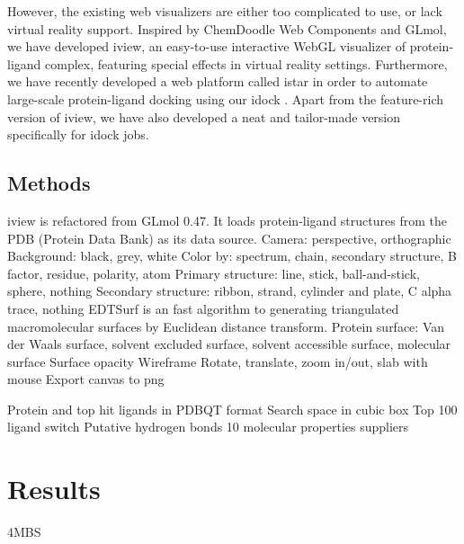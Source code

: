 \documentclass{bioinfo}
\begin{document}
However, the existing web visualizers are either too complicated to use, or lack virtual reality support. Inspired by ChemDoodle Web Components and GLmol, we have developed iview, an easy-to-use interactive WebGL visualizer of protein-ligand complex, featuring special effects in virtual reality settings. Furthermore, we have recently developed a web platform called istar in order to automate large-scale protein-ligand docking using our idock \citep{1153}. Apart from the feature-rich version of iview, we have also developed a neat and tailor-made version specifically for idock jobs.


\begin{methods}
\section{Methods}

iview is refactored from GLmol 0.47. It loads protein-ligand structures from the PDB (Protein Data Bank) \cite{539,537} as its data source.
Camera: perspective, orthographic
Background: black, grey, white
Color by: spectrum, chain, secondary structure, B factor, residue, polarity, atom
Primary structure: line, stick, ball-and-stick, sphere, nothing
Secondary structure: ribbon, strand, cylinder and plate, C alpha trace, nothing
EDTSurf \citep{1297} is an fast algorithm to generating triangulated macromolecular surfaces by Euclidean distance transform.
Protein surface: Van der Waals surface, solvent excluded surface, solvent accessible surface, molecular surface 
Surface opacity
Wireframe
Rotate, translate, zoom in/out, slab with mouse
Export canvas to png


Protein and top hit ligands in PDBQT format
Search space in cubic box
Top 100 ligand switch
Putative hydrogen bonds
10 molecular properties
suppliers

\end{methods}

\section{Results}

4MBS \citep{1348}
\end{document}
